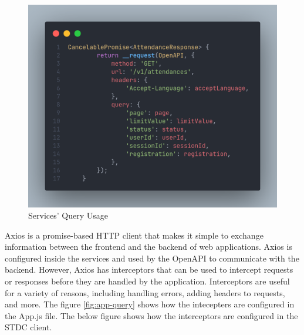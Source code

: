 \begin{justify}
        \begin{figure}[H]
            \centerline{\includegraphics[width=150mm,scale=1]{figures/implementation_and_testing/implementation/frontend/service_query.png}}
            \caption{Services' Query Usage}
        \end{figure}

        \vspace{0.25cm}
        \newendline Axios is a promise-based HTTP client that makes it simple to exchange information between the frontend and the backend of web applications. Axios is configured inside the services and used by the OpenAPI to communicate with the backend. However, Axios has interceptors that can be used to intercept requests or responses before they are handled by the application. Interceptors are useful for a variety of reasons, including handling errors, adding headers to requests, and more. The figure \ref{fig:app-query} shows how the intecepters are configured in the App.js file. The below figure shows how the interceptors are configured in the STDC client.


\end{justify}
